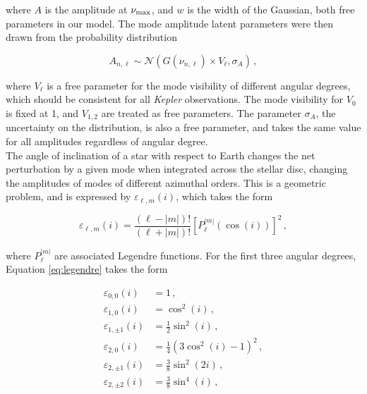 \documentclass[12pt]{article}
\newcommand{\numax}{\mbox{$\nu_{\rm max}$}\xspace}
\newcommand{\kepler}{\emph{Kepler}\xspace}
\begin{document}
\noindent where $A$ is the amplitude at \numax, and $w$ is the width of the Gaussian, both free parameters in our model. 
The mode amplitude latent parameters were then drawn from the probability distribution

\begin{equation}
	A_{n, \ell} \sim \mathcal{N}(G(\nu_{n,\ell}) \times V_\ell, \sigma_{A})\, ,
\end{equation}

\noindent where $V_\ell$ is a free parameter for the mode visibility of different angular degrees, which should be consistent for all \kepler observations. The mode visibility for $V_0$ is fixed at 1, and $V_{1,2}$ are treated as free parameters. The parameter $\sigma_{A}$, the uncertainty on the distribution, is also a free parameter, and takes the same value for all amplitudes regardless of angular degree.\\

The angle of inclination of a star with respect to Earth changes the net perturbation by a given mode when integrated across the stellar disc, changing the amplitudes of modes of different azimuthal orders. This is a geometric problem, and is expressed by $\varepsilon_{\ell, m}(i)$, which takes the form \cite{gizon+solanki2003}

\begin{equation}\label{eq:legendre}
	\varepsilon_{\ell, m}(i) = \frac{(\ell - |m|)!}{(\ell + |m|)!}\left[P_\ell^{|m|}(\cos(i))\right]^2\, ,
\end{equation}

\noindent where $P_\ell^{|m|}$ are associated Legendre functions. For the first three angular degrees, Equation \ref{eq:legendre} takes the form \cite{handberg+campante2011}

\begin{equation}
	\begin{split}
		\varepsilon_{0,0}(i) &= 1\, ,\\
		\varepsilon_{1,0}(i) &= \cos^2(i)\, ,    \\
		\varepsilon_{1,\pm1}(i) &= \frac{1}{2}\sin^2(i)\, ,\\
		\varepsilon_{2,0}(i) &= \frac{1}{4}(3\cos^2(i) - 1)^2\, ,\\
		\varepsilon_{2,\pm1}(i) &= \frac{3}{8}\sin^2(2i)\, ,\\
		\varepsilon_{2,\pm2}(i) &= \frac{3}{8}\sin^4(i)\, ,
	\end{split}
\end{equation}
\end{document}
